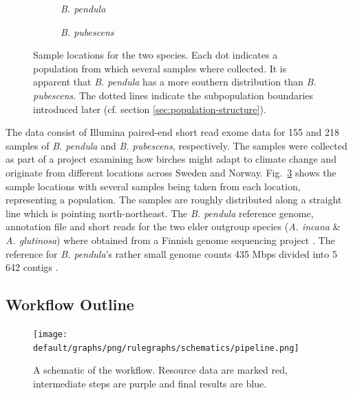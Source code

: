 \documentclass[hidelinks,11pt]{article}
\newcommand{\pendula}{\textit{B. pendula}}
\newcommand{\pubescens}{\textit{B. pubescens}}
\newcommand{\incana}{\textit{A. incana}}
\newcommand{\glutinosa}{\textit{A. glutinosa}}
\begin{document}
{    \begin{figure}[ht]
        \centering
        \begin{subfigure}[b]{0.47\textwidth}
            \centering
            \caption{\pendula{}}
            \label{fig:locations_pendula}
        \end{subfigure}
        \hfill
        \begin{subfigure}[b]{0.47\textwidth}
            \centering
            \caption{\pubescens{}}
            \label{fig:locations_pubescens}
        \end{subfigure}
        \caption{Sample locations for the two species. Each dot indicates a population from which several samples where collected. It is apparent that \pendula{} has a more southern distribution than \pubescens{}. The dotted lines indicate the subpopulation boundaries introduced later (cf. section \ref{sec:population-structure}).}
        \label{fig:locations}
    \end{figure}

    The data consist of Illumina paired-end short read exome data for 155 and 218 samples of \pendula{} and \pubescens{}, respectively. The samples were collected as part of a project examining how birches might adapt to climate change and originate from different locations across Sweden and Norway. Fig.~\ref{fig:locations} shows the sample locations with several samples being taken from each location, representing a population. The samples are roughly distributed along a straight line which is pointing north-northeast. The \pendula{} reference genome, annotation file and short reads for the two elder outgroup species (\incana{} \& \glutinosa{}) where obtained from a Finnish genome sequencing project \cite{jarkko}. The reference for \pendula{}'s rather small genome counts 435 Mbps divided into 5\,642 contigs \cite{ref-genome}.

    \subsection{Workflow Outline}
    \label{sec:workflow-outline}

    \begin{figure}[ht]
        \centering
        \texttt{[image: default/graphs/png/rulegraphs/schematics/pipeline.png]}
        \caption{A schematic of the workflow. Resource data are marked red, intermediate steps are purple and final results are blue.}
        \label{fig:workflow_schematic}
    \end{figure}

}
\end{document}
